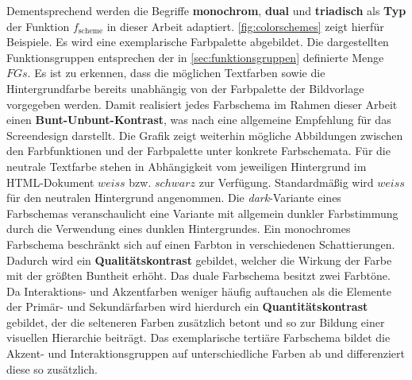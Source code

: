 Dementsprechend werden die Begriffe \textbf{monochrom}, \textbf{dual} und \textbf{triadisch} als \textbf{Typ} der Funktion $f_\text{scheme}$ in dieser Arbeit adaptiert. \autoref{fig:colorschemes} zeigt hierfür Beispiele. Es wird eine exemplarische Farbpalette abgebildet. Die dargestellten Funktionsgruppen entsprechen der in \autoref{sec:funktionsgruppen} definierte Menge $FGs$. Es ist zu erkennen, dass die möglichen Textfarben sowie die Hintergrundfarbe bereits unabhängig von der Farbpalette der Bildvorlage vorgegeben werden. Damit realisiert jedes Farbschema im Rahmen dieser Arbeit einen \textbf{Bunt-Unbunt-Kontrast}, was nach \citet{webx0} eine allgemeine Empfehlung für das Screendesign darstellt. Die Grafik zeigt weiterhin mögliche Abbildungen zwischen den Farbfunktionen und der Farbpalette unter \glqq{}konkrete Farbschemata\grqq{}. Für die neutrale Textfarbe stehen in Abhängigkeit vom jeweiligen Hintergrund im HTML-Dokument $weiss$ bzw. $schwarz$ zur Verfügung. Standardmäßig wird $weiss$ für den neutralen Hintergrund angenommen. Die \emph{dark}-Variante eines Farbschemas veranschaulicht eine Variante mit allgemein dunkler Farbstimmung durch die Verwendung eines dunklen Hintergrundes. Ein monochromes Farbschema beschränkt sich auf einen Farbton in verschiedenen Schattierungen. Dadurch wird ein \textbf{Qualitätskontrast} gebildet, welcher die Wirkung der Farbe mit der größten Buntheit erhöht. Das duale Farbschema besitzt zwei Farbtöne. Da Interaktions- und Akzentfarben weniger häufig auftauchen als die Elemente der Primär- und Sekundärfarben wird hierdurch ein \textbf{Quantitätskontrast} gebildet, der die selteneren Farben zusätzlich betont und so zur Bildung einer visuellen Hierarchie beiträgt. Das exemplarische tertiäre Farbschema bildet die Akzent- und Interaktionsgruppen auf unterschiedliche Farben ab und differenziert diese so zusätzlich. 